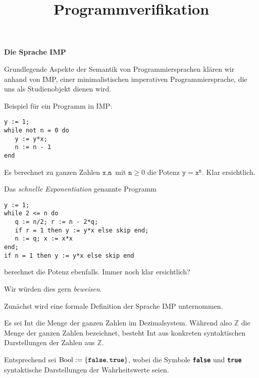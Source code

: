 \documentclass[8pt,fleqn,aspectratio=169]{beamer}
\title{Programmverifikation}
\date{}
\newcommand{\strong}[1]{\textsf{\textbf{#1}}}
\newcommand{\centerheadline}[1]{%
  \begin{center}\strong{#1}\end{center}}
\newcommand{\parspace}{\vspace{0.8em}}
\newcommand{\kw}[1]{\textbf{\texttt{#1}}}
\newcommand{\code}[1]{\texttt{#1}}
\newcommand{\Bool}{\mathrm{Bool}}
\newcommand{\Int}{\mathrm{Int}}
\newcommand{\Z}{\mathbb Z}
\begin{document}
\begin{frame}
\maketitle
\end{frame}

\begin{frame}
\centerheadline{Die Sprache IMP}
\end{frame}

\begin{frame}
Grundlegende Aspekte der Semantik von Programmiersprachen klären wir
anhand von IMP, einer minimalistischen imperativen Programmiersprache,
die uns als Studienobjekt dienen wird.
\end{frame}

\begin{frame}[fragile]

Beispiel für ein Programm in IMP:
\begin{lstlisting}[language=IMP, xleftmargin=\mathindent]
y := 1;
while not n = 0 do
   y := y*x;
   n := n - 1
end
\end{lstlisting}\pause
Es berechnet zu ganzen Zahlen $\code{x},\code{n}$ mit $\code{n}\ge 0$
die Potenz $\code{y} = \code{x}^{\code{n}}$. Klar ersichtlich.\pause

\parspace
Das \emph{schnelle Exponentiation} genannte Programm
\begin{lstlisting}[language=IMP, xleftmargin=\mathindent]
y := 1;
while 2 <= n do
   q := n/2; r := n - 2*q;
   if r = 1 then y := y*x else skip end;
   n := q; x := x*x
end;
if n = 1 then y := y*x else skip end
\end{lstlisting}
berechnet die Potenz ebenfalls. Immer noch klar ersichtlich?

\parspace
Wir würden dies gern \emph{beweisen}.
\end{frame}

\begin{frame}
Zunächst wird eine formale Definition der Sprache IMP unternommen.\pause

\parspace
Es sei $\Int$ die Menge der ganzen Zahlen im Dezimalsystem. Während also
$\Z$ die Menge der ganzen Zahlen bezeichnet, besteht $\Int$ aus konkreten
syntaktischen Darstellungen der Zahlen aus $\Z$.\pause

\parspace
Entsprechend sei $\Bool:=\{\kw{false},\kw{true}\}$, wobei die
Symbole \kw{false} und \kw{true} syntaktische Darstellungen der
Wahrheitswerte seien.
\end{frame}
\end{document}
